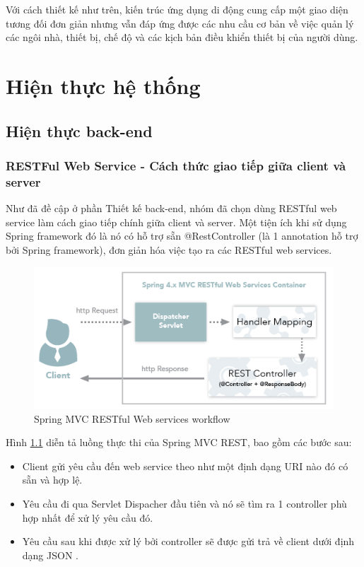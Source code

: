 \documentclass[12pt,a4paper,oneside]{extbook}
\begin{document}
\noindent
Với cách thiết kế như trên, kiến trúc ứng dụng di động cung cấp một giao diện tương đối đơn giản nhưng vẫn đáp ứng được các nhu cầu cơ bản về việc quản lý các ngôi nhà, thiết bị, chế độ và các kịch bản điều khiển thiết bị của người dùng.

\chapter{Hiện thực hệ thống}

\section{Hiện thực back-end}\label{back-end-implementation}

\subsection{RESTFul Web Service - Cách thức giao tiếp giữa client và server}

Như đã đề cập ở phần Thiết kế back-end, nhóm đã chọn dùng RESTful web service làm cách giao tiếp chính giữa client và server. Một tiện ích khi sử dụng Spring framework đó là nó có hỗ trợ sẵn @RestController (là 1 annotation hỗ trợ bởi Spring framework), đơn giản hóa việc tạo ra các RESTful web services.

\begin{figure}[h]
  \centering
     \includegraphics[width=12cm]{6-spring-RESTfulWS-workflow}
  \caption{Spring MVC RESTful Web services workflow}\label{fig:6-spring-RESTfulWS-workflow}
\end{figure} 

\noindent
Hình \ref{fig:6-spring-RESTfulWS-workflow} diễn tả luồng thực thi của Spring MVC REST, bao gồm các bước sau:

\begin{itemize}[topsep=1mm,itemsep=-0.5mm]
\item Client gửi yêu cầu đến web service theo như một định dạng URI nào đó có sẵn và hợp lệ.
\item Yêu cầu đi qua Servlet Dispacher đầu tiên và nó sẽ tìm ra 1 controller phù hợp nhất để xử lý yêu cầu đó.
\item Yêu cầu sau khi được xử lý bởi controller sẽ được gửi trả về client dưới định dạng JSON \cite{rest-controller}.
\vspace{1mm}
\end{itemize}
\end{document}
